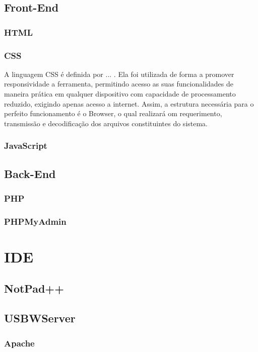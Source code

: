 \documentclass[12pt,a4paper]{book}
\begin{document}
\subsection{Front-End}
\subsubsection{HTML}

\subsubsection{CSS}
A linguagem CSS é definida por ... . Ela foi utilizada de forma a promover responsividade a ferramenta, permitindo acesso as suas funcionalidades de maneira prática em qualquer dispositivo com capacidade de processamento reduzido, exigindo apenas acesso a internet. Assim, a estrutura necessária para o perfeito funcionamento é o Browser, o qual realizará om requerimento, transmissão e decodificação dos arquivos constituintes do sistema.
\subsubsection{JavaScript}

\subsection{Back-End}
\subsubsection{PHP}

\subsubsection{PHPMyAdmin}

\section{IDE}
\subsection{NotPad++}

\subsection{USBWServer}
\subsubsection{Apache}
\end{document}
